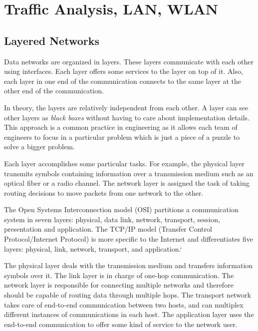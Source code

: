 \chapter{Traffic Analysis, LAN, WLAN}

\section{Layered Networks}
Data networks are organized in layers.
These layers communicate with each other using interfaces.
Each layer offers some services to the layer on top of it.
Also, each layer in one end of the communication connects to the same layer at the other end of the communication.

In theory, the layers are relatively independent from each other.
A layer can see other layers as \emph{black boxes} without having to care about implementation details.
This approach is a common practice in engineering as it allows each team of engineers to focus in a particular problem which is just a piece of a puzzle to solve a bigger problem.

Each layer accomplishes some particular tasks.
For example, the physical layer transmits symbols containing information over a transmission medium such as an optical fiber or a radio channel.
The network layer is assigned the task of taking routing decisions to move packets from one network to the other.

The Open Systems Interconnection model (OSI) partitions a communication system in seven layers: physical, data link, network, transport, session, presentation and application.
The TCP/IP model (Transfer Control Protocol/Internet Protocol) is more specific to the Internet and differentiates five layers: physical, link, network, transport, and application.`

The physical layer deals with the transmission medium and transfers information symbols over it.
The link layer is in charge of one-hop communication.
The network layer is responsible for connecting multiple networks and therefore should be capable of routing data through multiple hops.
The transport network takes care of end-to-end communication between two hosts, and can multiplex different instances of communications in each host.
The application layer uses the end-to-end communication to offer some kind of service to the network user.
